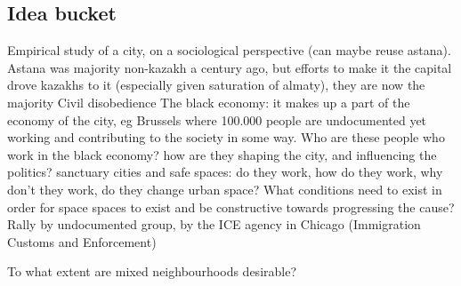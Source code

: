 \documentclass{article}
\begin{document}
\subsection{Idea bucket}

\begin{outline}
	\1 Empirical study of a city, on a sociological perspective (can maybe reuse astana). Astana was majority non-kazakh a century ago, but efforts to make it the capital drove kazakhs to it (especially given saturation of almaty), they are now the majority
	\1 Civil disobedience 
	\1 The black economy: it makes up a part of the economy of the city, eg Brussels where 100.000 people are undocumented yet working and contributing to the society in some way. Who are these people who work in the black economy? how are they shaping the city, and influencing the politics?
	\1 sanctuary cities and safe spaces: do they work, how do they work, why don't they work, do they change urban space?
		\2 What conditions need to exist in order for space spaces to exist and be constructive towards progressing the cause?
		\2 Rally by undocumented group, by the ICE agency in Chicago (Immigration Customs and Enforcement)
\end{outline}

\pagebreak 

To what extent are mixed neighbourhoods desirable?

\printbibliography


\begin{outline}
	\1
\end{outline}

\fi
\end{document}

